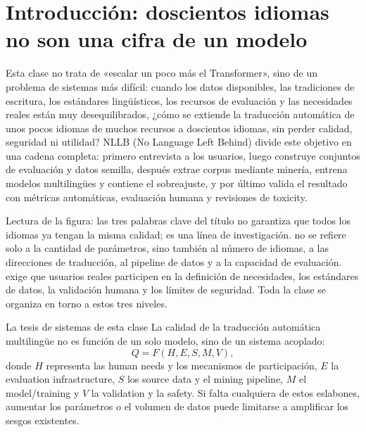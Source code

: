 \section{Introducción: doscientos idiomas no son una cifra de un modelo}

Esta clase no trata de «escalar un poco más el Transformer», sino de un problema de sistemas más difícil: cuando los datos disponibles, las tradiciones de escritura, los estándares lingüísticos, los recursos de evaluación y las necesidades reales están muy desequilibrados, ¿cómo se extiende la traducción automática de unos pocos idiomas de muchos recursos a doscientos idiomas, sin perder calidad, seguridad ni utilidad? NLLB (No Language Left Behind) divide este objetivo en una cadena completa: primero entrevista a los usuarios, luego construye conjuntos de evaluación y datos semilla, después extrae corpus mediante minería, entrena modelos multilingües y contiene el sobreajuste, y por último valida el resultado con métricas automáticas, evaluación humana y revisiones de toxicity.


\begin{knowledgebox}{Lectura de la figura: las tres palabras clave del título}
 no garantiza que todos los idiomas ya tengan la misma calidad; es una línea de investigación.  no se refiere solo a la cantidad de parámetros, sino también al número de idiomas, a las direcciones de traducción, al pipeline de datos y a la capacidad de evaluación.  exige que usuarios reales participen en la definición de necesidades, los estándares de datos, la validación humana y los límites de seguridad. Toda la clase se organiza en torno a estos tres niveles.
\end{knowledgebox}


\begin{importantbox}{La tesis de sistemas de esta clase}
La calidad de la traducción automática multilingüe no es función de un solo modelo, sino de un sistema acoplado:
\[
Q = F(H,E,S,M,V),
\]
donde $H$ representa las human needs y los mecanismos de participación, $E$ la evaluation infrastructure, $S$ los source data y el mining pipeline, $M$ el model/training y $V$ la validation y la safety. Si falta cualquiera de estos eslabones, aumentar los parámetros o el volumen de datos puede limitarse a amplificar los sesgos existentes.
\end{importantbox}

